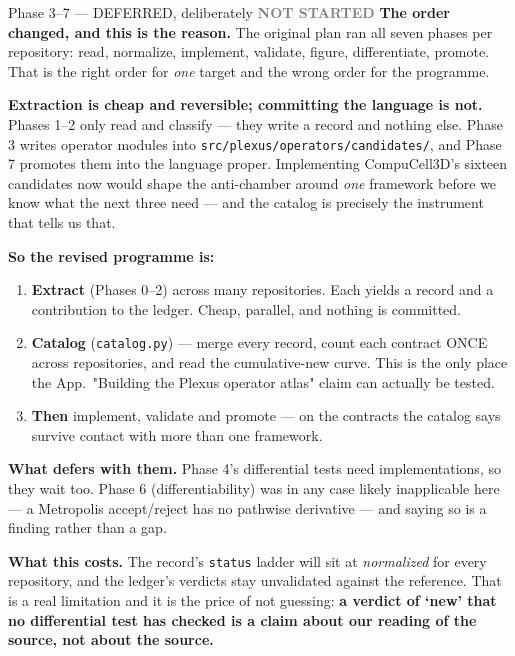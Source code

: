 \documentclass[11pt,a4paper]{article}
\newcommand{\code}[1]{\texttt{#1}}
\newcommand{\todo}{\textcolor{grey}{\textbf{NOT STARTED}}}
\begin{document}
\begin{phasebox}{Phase 3--7 --- DEFERRED, deliberately \hfill \todo}
\textbf{The order changed, and this is the reason.} The original plan ran all seven phases per
repository: read, normalize, implement, validate, figure, differentiate, promote. That is the
right order for \emph{one} target and the wrong order for the programme.

\textbf{Extraction is cheap and reversible; committing the language is not.} Phases 1--2 only read
and classify --- they write a record and nothing else. Phase 3 writes operator modules into
\code{src/plexus/operators/candidates/}, and Phase 7 promotes them into the language proper.
Implementing CompuCell3D's sixteen candidates now would shape the anti-chamber around \emph{one}
framework before we know what the next three need --- and the catalog is precisely the instrument
that tells us that.

\textbf{So the revised programme is:}

\begin{enumerate}[leftmargin=1.5em,itemsep=1pt]
\item \textbf{Extract} (Phases 0--2) across many repositories. Each yields a record and a
contribution to the ledger. Cheap, parallel, and nothing is committed.
\item \textbf{Catalog} (\code{catalog.py}) --- merge every record, count each contract ONCE across
repositories, and read the cumulative-new curve. This is the only place the App.~"Building the Plexus operator atlas" claim can
actually be tested.
\item \textbf{Then} implement, validate and promote --- on the contracts the catalog says survive
contact with more than one framework.
\end{enumerate}

\textbf{What defers with them.} Phase 4's differential tests need implementations, so they wait
too. Phase 6 (differentiability) was in any case likely inapplicable here --- a Metropolis
accept/reject has no pathwise derivative --- and saying so is a finding rather than a gap.

\textbf{What this costs.} The record's \code{status} ladder will sit at \emph{normalized} for every
repository, and the ledger's verdicts stay unvalidated against the reference. That is a real
limitation and it is the price of not guessing: \textbf{a verdict of `new' that no differential
test has checked is a claim about our reading of the source, not about the source.}
\end{phasebox}
\end{document}
